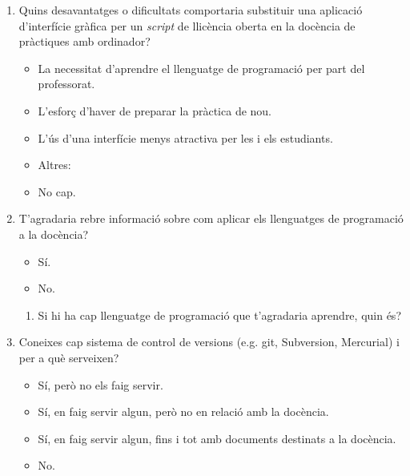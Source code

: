 \documentclass[a4paper,12pt]{article}
\begin{document}
\begin{enumerate}
\item Quins desavantatges o dificultats comportaria substituir una aplicació d'interfície gràfica
      per un \emph{script} de llicència oberta en la docència de pràctiques amb ordinador?
   \begin{itemize}
   \item La necessitat d'aprendre el llenguatge de programació per part del professorat.
   \item L'esforç d'haver de preparar la pràctica de nou.
   \item L'ús d'una interfície menys atractiva per les i els estudiants.
   \item Altres:
   \item No cap.
   \end{itemize}

\item T'agradaria rebre informació sobre com aplicar els llenguatges de programació a la docència?
   \begin{itemize}
   \item Sí.
   \item No.
   \end{itemize}

   \begin{enumerate}
   \item Si hi ha cap llenguatge de programació que t'agradaria aprendre, quin és?
   \vspace*{1cm}
   \end{enumerate}

\item Coneixes cap sistema de control de versions (e.g. \textsf{git}, Subversion, Mercurial) i
      per a què serveixen?
   \begin{itemize}
   \item Sí, però no els faig servir.
   \item Sí, en faig servir algun, però no en relació amb la docència.
   \item Sí, en faig servir algun, fins i tot amb documents destinats a la docència.
   \item No.
   \end{itemize}


\end{enumerate}
\end{document}
